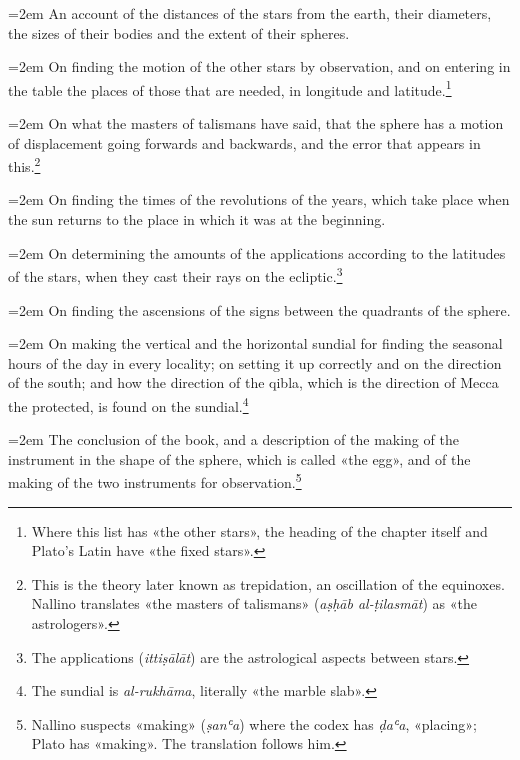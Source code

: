 \documentclass[11pt]{article}
\begin{document}
\par\noindent\hangindent=2em An account of the distances of the stars from the earth, their diameters, the sizes of their bodies and the extent of their spheres.\par
\par\noindent\hangindent=2em On finding the motion of the other stars by observation, and on entering in the table the places of those that are needed, in longitude and latitude.\footnote{Where this list has «the other stars», the heading of the chapter itself and Plato's Latin have «the fixed stars».}\par
\par\noindent\hangindent=2em On what the masters of talismans have said, that the sphere has a motion of displacement going forwards and backwards, and the error that appears in this.\footnote{This is the theory later known as trepidation, an oscillation of the equinoxes. Nallino translates «the masters of talismans» (\emph{aṣḥāb al-ṭilasmāt}) as «the astrologers».}\par
\par\noindent\hangindent=2em On finding the times of the revolutions of the years, which take place when the sun returns to the place in which it was at the beginning.\par
\par\noindent\hangindent=2em On determining the amounts of the applications according to the latitudes of the stars, when they cast their rays on the ecliptic.\footnote{The applications (\emph{ittiṣālāt}) are the astrological aspects between stars.}\par
\par\noindent\hangindent=2em On finding the ascensions of the signs between the quadrants of the sphere.\par
\par\noindent\hangindent=2em On making the vertical and the horizontal sundial for finding the seasonal hours of the day in every locality; on setting it up correctly and on the direction of the south; and how the direction of the qibla, which is the direction of Mecca the protected, is found on the sundial.\footnote{The sundial is \emph{al-rukhāma}, literally «the marble slab».}\par
\par\noindent\hangindent=2em The conclusion of the book, and a description of the making of the instrument in the shape of the sphere, which is called «the egg», and of the making of the two instruments for observation.\footnote{Nallino suspects «making» (\emph{ṣanʿa}) where the codex has \emph{ḍaʿa}, «placing»; Plato has «making». The translation follows him.}\par
\end{document}

